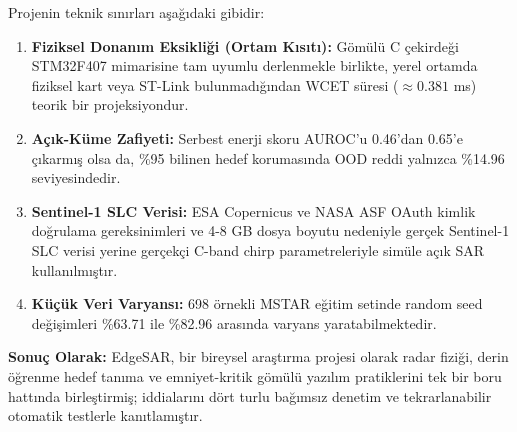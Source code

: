 \documentclass[11pt,a4paper]{article}
\begin{document}
Projenin teknik sınırları aşağıdaki gibidir:
\begin{enumerate}
    \item \textbf{Fiziksel Donanım Eksikliği (Ortam Kısıtı):} Gömülü C çekirdeği STM32F407 mimarisine tam uyumlu derlenmekle birlikte, yerel ortamda fiziksel kart veya ST-Link bulunmadığından WCET süresi ($\approx 0.381$ ms) teorik bir projeksiyondur.
    \item \textbf{Açık-Küme Zafiyeti:} Serbest enerji skoru AUROC'u 0.46'dan 0.65'e çıkarmış olsa da, \%95 bilinen hedef korumasında OOD reddi yalnızca \%14.96 seviyesindedir.
    \item \textbf{Sentinel-1 SLC Verisi:} ESA Copernicus ve NASA ASF OAuth kimlik doğrulama gereksinimleri ve 4-8 GB dosya boyutu nedeniyle gerçek Sentinel-1 SLC verisi yerine gerçekçi C-band chirp parametreleriyle simüle açık SAR kullanılmıştır.
    \item \textbf{Küçük Veri Varyansı:} 698 örnekli MSTAR eğitim setinde random seed değişimleri \%63.71 ile \%82.96 arasında varyans yaratabilmektedir.
\end{enumerate}

\textbf{Sonuç Olarak:} EdgeSAR, bir bireysel araştırma projesi olarak radar fiziği, derin öğrenme hedef tanıma ve emniyet-kritik gömülü yazılım pratiklerini tek bir boru hattında birleştirmiş; iddialarını dört turlu bağımsız denetim ve tekrarlanabilir otomatik testlerle kanıtlamıştır.
\end{document}
